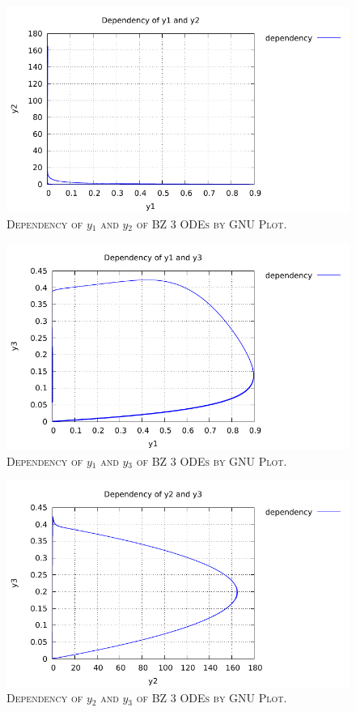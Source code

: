 \documentclass[a4paper,oneside]{book}
\numberwithin{equation}{chapter}
\begin{document}
\begin{figure}[H]
\centering
\includegraphics[scale=1.1]{bz3_d_1_2}
\caption{\textsc{Dependency of $y_1$ and $y_2$ of BZ 3 ODEs by GNU Plot.}}
\end{figure}
\begin{figure}[H]
\centering
\includegraphics[scale=1.1]{bz3_d_1_3}
\caption{\textsc{Dependency of $y_1$ and $y_3$ of BZ 3 ODEs by GNU Plot.}}
\end{figure}
\begin{figure}[H]
\centering
\includegraphics[scale=1.1]{bz3_d_2_3}
\caption{\textsc{Dependency of $y_2$ and $y_3$ of BZ 3 ODEs by GNU Plot.}}
\end{figure}
\end{document}
